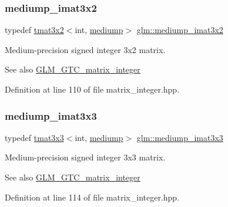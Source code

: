\subsubsection{\texorpdfstring{mediump\_imat3x2}{mediump\_imat3x2}}
{\footnotesize\ttfamily typedef \mbox{\hyperlink{structglm_1_1tmat3x2}{tmat3x2}}$<$int, \mbox{\hyperlink{namespaceglm_a0f04f086094c747d227af4425893f545a6416f3ea0c9025fb21ed50c4d6620482}{mediump}}$>$ \mbox{\hyperlink{group__gtc__matrix__integer_ga8f682b5b64e2072c0729409ee6bfe2af}{glm\+::mediump\+\_\+imat3x2}}}

Medium-\/precision signed integer 3x2 matrix. \begin{DoxySeeAlso}{See also}
\mbox{\hyperlink{group__gtc__matrix__integer}{G\+L\+M\+\_\+\+G\+T\+C\+\_\+matrix\+\_\+integer}} 
\end{DoxySeeAlso}


Definition at line 110 of file matrix\+\_\+integer.\+hpp.

\mbox{\label{group__gtc__matrix__integer_gab4c647321a342c58119144ad08c6c406}} 
\subsubsection{\texorpdfstring{mediump\_imat3x3}{mediump\_imat3x3}}
{\footnotesize\ttfamily typedef \mbox{\hyperlink{structglm_1_1tmat3x3}{tmat3x3}}$<$int, \mbox{\hyperlink{namespaceglm_a0f04f086094c747d227af4425893f545a6416f3ea0c9025fb21ed50c4d6620482}{mediump}}$>$ \mbox{\hyperlink{group__gtc__matrix__integer_gab4c647321a342c58119144ad08c6c406}{glm\+::mediump\+\_\+imat3x3}}}

Medium-\/precision signed integer 3x3 matrix. \begin{DoxySeeAlso}{See also}
\mbox{\hyperlink{group__gtc__matrix__integer}{G\+L\+M\+\_\+\+G\+T\+C\+\_\+matrix\+\_\+integer}} 
\end{DoxySeeAlso}


Definition at line 114 of file matrix\+\_\+integer.\+hpp.

\mbox{\label{group__gtc__matrix__integer_ga721a754fc35cc5ac097e331d893a6b2c}} 
